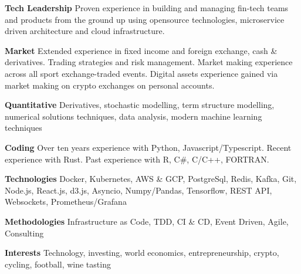 {\bf Tech Leadership} Proven experience in building and managing fin-tech teams and products from
the ground up using opensource technologies, microservice driven architecture and cloud infrastructure.

{\bf Market} Extended experience in fixed income and foreign exchange, cash \& derivatives.
Trading strategies and risk management.
Market making experience across all sport exchange-traded events.
Digital assets experience gained via market making on crypto exchanges on personal accounts.

{\bf Quantitative} Derivatives, stochastic modelling, term structure modelling, numerical solutions techniques,
data analysis, modern machine learning techniques

{\bf Coding} Over ten years experience with Python, Javascript/Typescript. Recent experience with Rust.
Past experience with R, C\#, C/C++, FORTRAN.

{\bf Technologies} Docker, Kubernetes, AWS \& GCP, PostgreSql, Redis, Kafka, Git, Node.js, React.js, d3.js, Asyncio, Numpy/Pandas,
Tensorflow, REST API, Websockets, Prometheus/Grafana

{\bf Methodologies} Infrastructure as Code, TDD, CI \& CD, Event Driven, Agile, Consulting

{\bf Interests} Technology, investing, world economics, entrepreneurship, crypto, cycling, football, wine tasting
